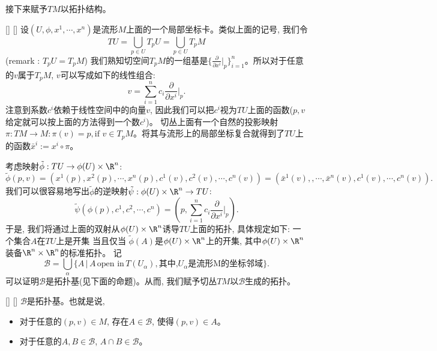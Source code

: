 \documentclass[UTF8]{ctexart}
\begin{document}
    接下来赋予$TM$以拓扑结构。

    \begin{dfn}
        []
        {}
        []
        []
    \label{tangentbundle}
        设$(U, \phi, x^1, \cdots, x^n)$是流形$M$上面的一个局部坐标卡。类似上面的记号, 我们令
        \[
            T U = \bigcup_{p \in U} T_p U = \bigcup_{p \in U} T_p M
        \]
        (remark : $T_p U = T_p M$) 我们熟知切空间$T_p M$的一组基是$ \{ \frac{\partial}{\partial x^i} |_p \}_{i=1}^n $。所以对于任意的$v$属于$T_p M$, $v$可以写成如下的线性组合:
        \[
            v = \sum_{i=1}^n c_i \frac{\partial}{\partial x^i}|_p.
        \]
        注意到系数$c^i$依赖于线性空间中的向量$v$, 因此我们可以把$c^i$视为$T U$上面的函数($p,v$给定就可以按上面的方法得到一个数$c^i$)。
        切丛上面有一个自然的投影映射$\pi : T M \rightarrow M : \pi(v) = p , \text{if } v \in T_p M$。将其与流形上的局部坐标复合就得到了$T U$上的函数$\bar{x}^i := x^i \circ \pi$。

        考虑映射$\tilde{\phi}: T U \rightarrow \phi(U) \times \R^n$:
        \[
            \tilde{\phi}(p,v) = (x^1(p),x^2(p), \cdots, x^n(p),c^1(v),c^2(v),\cdots,c^n(v))=(\bar{x}^1(v),,\cdots,\bar{x}^n(v),c^1(v),\cdots,c^n(v)).
        \]
        我们可以很容易地写出$\tilde{\phi}$的逆映射$\tilde{\psi} : \phi(U) \times \R^n \rightarrow T U$:
        \[
            \tilde{\psi}(\phi(p) , c^1, c^2 ,\cdots ,c^n)
            = 
            (p, \sum_{i=1}^n c_i \frac{\partial}{\partial x^i}|_p).
        \]
        于是, 我们将通过上面的双射从$\phi(U) \times \R^n$诱导$T U$上面的拓扑, 具体规定如下: 一个集合$A$在$T U$上是开集 当且仅当 $\tilde{\phi}(A)$是$\phi(U) \times \R^n$上的开集, 其中$\phi(U) \times \R^n$装备$\R^n \times \R^n$的标准拓扑。
        记
        \[
            \mathcal{B} = \bigcup_{\alpha} \{ A \,|\, A \, \text{open in} \, T(U_{\alpha}), \text{其中,} U_{\alpha} \text{是流形M的坐标邻域} \}.
        \]
        可以证明$\mathcal{B}$是拓扑基(见下面的命题)。从而, 我们赋予切丛$TM$以$\mathcal{B}$生成的拓扑。
    \end{dfn}

    \begin{ppt}
        []
        {}
        []
        []
        $\mathcal{B}$是拓扑基。也就是说,
        \begin{itemize}
            \item 对于任意的$(p,v) \in M$, 存在$A \in \mathcal{B}$, 使得$(p,v) \in A$。
            \item 对于任意的$A, B \in \mathcal{B}$, $A \cap B \in \mathcal{B}$。
        \end{itemize}
    \end{ppt}
\end{document}
